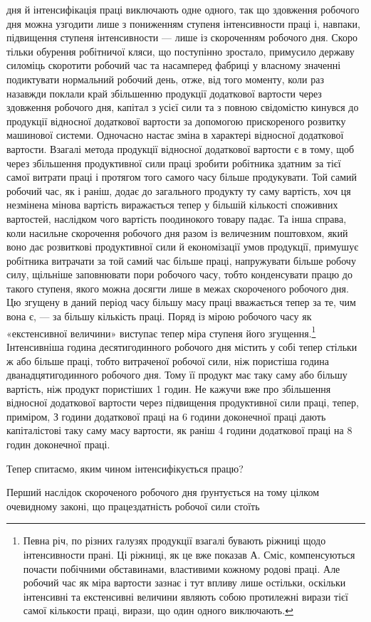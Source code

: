 дня й інтенсифікація праці виключають одне одного, так що
здовження робочого дня можна узгодити лише з пониженням
ступеня інтенсивности праці і, навпаки, підвищення ступеня інтенсивности
— лише із скороченням робочого дня. Скоро тільки
обурення робітничої кляси, що поступінно зростало, примусило
державу силоміць скоротити робочий час та насамперед фабриці
у власному значенні подиктувати нормальний робочий день,
отже, від того моменту, коли раз назавжди поклали край збільшенню
продукції додаткової вартости через здовження робочого
дня, капітал з усієї сили та з повною свідомістю кинувся до продукції
відносної додаткової вартости за допомогою прискореного
розвитку машинової системи. Одночасно настає зміна в характері
відносної додаткової вартости. Взагалі метода продукції відносної
додаткової вартости є в тому, щоб через збільшення продуктивної
сили праці зробити робітника здатним за тієї самої витрати праці
і протягом того самого часу більше продукувати. Той самий
робочий час, як і раніш, додає до загального продукту ту саму
вартість, хоч ця незмінена мінова вартість виражається тепер у
більшій кількості споживних вартостей, наслідком чого вартість
поодинокого товару падає. Та інша справа, коли насильне скорочення
робочого дня разом із величезним поштовхом, який воно
дає розвиткові продуктивної сили й економізації умов продукції,
примушує робітника витрачати за той самий час більше праці,
напружувати більше робочу силу, щільніше заповнювати пори
робочого часу, тобто конденсувати працю до такого ступеня, якого
можна досягти лише в межах скороченого робочого дня. Цю
згущену в даний період часу більшу масу праці вважається тепер
за те, чим вона є, — за більшу кількість праці. Поряд із мірою
робочого часу як «екстенсивної величини» виступає тепер міра
ступеня його згущення.\footnote{
Певна річ, по різних галузях продукції взагалі бувають ріжниці
щодо інтенсивности прані. Ці ріжниці, як це вже показав А. Сміс, компенсуються
почасти побічними обставинами, властивими кожному родові
праці. Але робочий час як міра вартости зазнає і тут впливу лише остільки,
оскільки інтенсивні та екстенсивні величини являють собою протилежні
вирази тієї самої кількости праці, вирази, що один одного виключають.
} Інтенсивніша година десятигодинного
робочого дня містить у собі тепер стільки ж або більше праці,
тобто витраченої робочої сили, ніж пористіша година дванадцятигодинного
робочого дня. Тому її продукт має таку саму або більшу
вартість, ніж продукт пористіших 1 годин. Не кажучи вже про
збільшення відносної додаткової вартости через підвищення продуктивної
сили праці, тепер, приміром, З  години додаткової
праці на 6 години доконечної праці дають капіталістові таку
саму масу вартости, як раніш 4 години додаткової праці на 8 годин
доконечної праці.

Тепер спитаємо, яким чином інтенсифікується працю?

Перший наслідок скороченого робочого дня ґрунтується на тому
цілком очевидному законі, що працездатність робочої сили стоїть